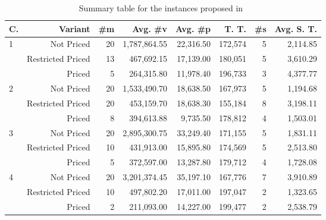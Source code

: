 \documentclass[ppgc,tese,english,formais,babel]{iiufrgs}
\begin{document}
\begin{table}
\centering
\caption{Summary table for the instances proposed in~\citet{velasco:2019}}
\begin{tabular}{lrrrrrrr}
\hline\hline
C. & Variant & \#m & Avg. \#v & Avg. \#p & T. T. & \#s & Avg. S. T. \\\hline
\multirow{3}{*}{1} & Not Priced & 20 & 1,787,864.55 & 22,316.50 & 172,574 & 5 & 2,114.85 \\
                   & Restricted Priced & 13 & 467,692.15 & 17,139.00 & 180,051 & 5 & 3,610.29 \\
\vspace{1.5mm}     & Priced & 5 & 264,315.80 & 11,978.40 & 196,733 & 3 & 4,377.77 \\
\multirow{3}{*}{2} & Not Priced & 20 & 1,533,490.70 & 18,638.50 & 167,973 & 5 & 1,194.68 \\
                   & Restricted Priced & 20 & 453,159.70 & 18,638.30 & 155,184 & 8 & 3,198.11 \\
\vspace{1.5mm}     & Priced & 8 & 394,613.88 & 9,735.50 & 178,812 & 4 & 1,503.01 \\
\multirow{3}{*}{3} & Not Priced & 20 & 2,895,300.75 & 33,249.40 & 171,155 & 5 & 1,831.11 \\
                   & Restricted Priced & 10 & 431,913.00 & 15,895.80 & 174,569 & 5 & 2,513.80 \\
\vspace{1.5mm}     & Priced & 5 & 372,597.00 & 13,287.80 & 179,712 & 4 & 1,728.08 \\
\multirow{3}{*}{4} & Not Priced & 20 & 3,201,374.45 & 35,197.10 & 167,776 & 7 & 3,910.89 \\
                   & Restricted Priced & 10 & 497,802.20 & 17,011.00 & 197,047 & 2 & 1,323.65 \\
                   & Priced & 2 & 211,093.00 & 14,227.00 & 199,477 & 2 & 2,538.79 \\\hline\hline
\end{tabular}
\label{tab:velasco_summary}
\end{table}
\end{document}
